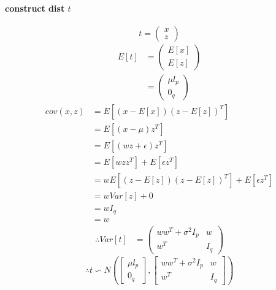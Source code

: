 \documentclass{report}
\begin{document}
\paragraph{construct dist $t$\\}
$$
t = 
\left (
\begin{matrix}
x\\
z
\end{matrix}
\right )
$$
\begin{equation}
\begin{aligned}
E[t] &= 
\left (
\begin{matrix}
E[x]\\
E[z]
\end{matrix}
\right )\\
&=
\left (
\begin{matrix}
\mu l_p\\
0_q
\end{matrix}
\right )
\end{aligned}
\end{equation}
\begin{equation}
\begin{aligned}
cov(x,z)
&= E[(x - E[x])(z - E[z])^T]\\
&= E[(x - \mu)z^T]\\
&= E[(wz + \epsilon)z^T]\\
&= E[wzz^T] + E[\epsilon z^T]\\
&= w E[(z - E[z])(z - E[z])^T] + E[\epsilon z^T]\\
&= w Var[z] + 0\\
&= w I_q\\
&= w
\end{aligned}
\end{equation}
\begin{equation}
\begin{aligned}
\therefore 
Var[t] &= 
\left (
\begin{matrix}
ww^T + \sigma^2 I_p & w\\
w^T & I_q
\end{matrix}
\right )
\end{aligned}
\end{equation}
$$
\therefore 
t \backsim 
N(
\left [
\begin{matrix}
\mu l_p\\
0_q
\end{matrix}
\right ],
\left [
\begin{matrix}
ww^T + \sigma^2 I_p & w\\
w^T & I_q
\end{matrix}
\right ]
)
$$
\end{document}
